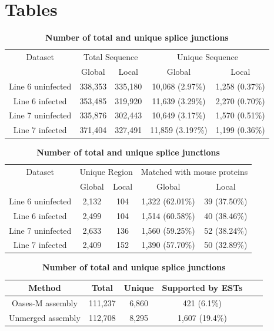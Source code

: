 \documentclass[10pt]{article}
\begin{document}
\section*{Tables}
\begin{table}[!ht]
\caption{
\bf{Unique sequences from global and local assembly}}
\begin{tabular}{ccccc}
\hline
Dataset & \multicolumn{2}{c}{Total Sequence} & \multicolumn{2}{c}{Unique Sequence}\\
 & Global & Local & Global & Local\\
\hline
Line 6 uninfected & 338,353 & 335,180 & 10,068 (2.97\%) & 1,258 (0.37\%)\\
Line 6 infected & 353,485 & 319,920 & 11,639 (3.29\%)& 2,270 (0.70\%)\\
Line 7 uninfected & 335,876 & 302,443 & 10,649 (3.17\%) & 1,570 (0.51\%)\\
Line 7 infected & 371,404 & 327,491 & 11,859 (3.19?\%)& 1,199 (0.36\%)\\
\hline
\end{tabular}
\label{unique_sequences}

\caption{
\bf{Unique regions from global and local assembly}}
\begin{tabular}{ccccc}
\hline
Dataset & \multicolumn{2}{c}{Unique Region} & \multicolumn{2}{c}{Matched with mouse proteins}\\
 & Global & Local & Global & Local\\
\hline
Line 6 uninfected & 2,132 & 104 & 1,322 (62.01\%) & 39 (37.50\%)\\
Line 6 infected & 2,499 & 104 & 1,514 (60.58\%)& 40 (38.46\%)\\
Line 7 uninfected & 2,633 & 136 & 1,560 (59.25\%) & 52 (38.24\%)\\
Line 7 infected & 2,409 & 152 & 1,390 (57.70\%)& 50 (32.89\%)\\
\hline
\end{tabular}
\label{unique_sequences_matched_mouse}

\caption{
\bf{Number of total and unique splice junctions}}
\begin{tabular}{cccccc}
\hline
Method& Total & Unique & Supported by ESTs \\ 
\hline
Oases-M assembly & 111,237 & 6,860 & 421 (6.1\%) \\
Unmerged assembly & 112,708 & 8,295 & 1,607 (19.4\%) \\
\hline
\end{tabular}
\label{Oases-M}


\end{table}
\end{document}
